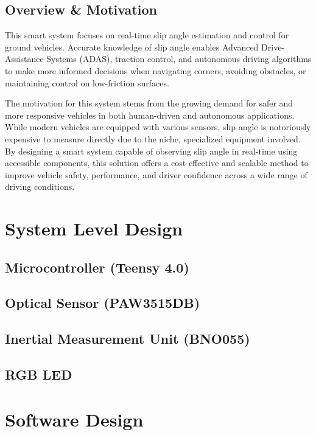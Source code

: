 \documentclass[12pt]{article}
\begin{document}
        \subsection{Overview \& Motivation}
        
        This smart system focuses on real-time slip angle estimation and control for ground vehicles. Accurate knowledge of 
        slip angle enables Advanced Drive-Assistance Systems (ADAS), traction control, and autonomous driving algorithms to make 
        more informed decisions when navigating corners, avoiding obstacles, or maintaining control on low-friction surfaces. 
        
        The motivation for this system stems from the growing demand for safer and more responsive vehicles in both human-driven 
        and autonomous applications. While modern vehicles are equipped with various sensors, slip angle is notoriously expensive 
        to measure directly due to the niche, specialized equipment involved. By designing a smart system capable of observing slip 
        angle in real-time using accessible components, this solution offers a cost-effective and scalable method to improve vehicle 
        safety, performance, and driver confidence across a wide range of driving conditions. 

    \section{System Level Design}
        \subsection{Microcontroller (Teensy 4.0)}
        \subsection{Optical Sensor (PAW3515DB)}
        \subsection{Inertial Measurement Unit (BNO055)}
        \subsection{RGB LED}
    \section{Software Design}

    \newpage
    \printbibliography[title=Works Cited]

\end{document}
